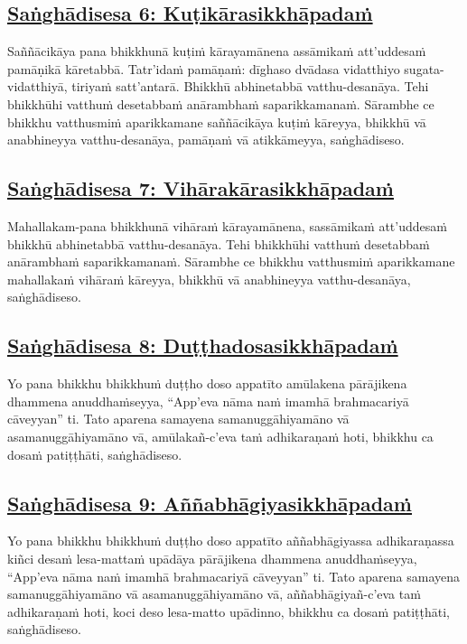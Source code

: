 \subsection*{\hyperref[comm6]{Saṅghādisesa 6: Kuṭikārasikkhāpadaṁ}}
\label{sd6}
Saññācikāya pana bhikkhunā kuṭiṁ kārayamānena assāmikaṁ att'uddesaṁ pamāṇikā kāretabbā. Tatr'idaṁ pamāṇaṁ: dīghaso dvādasa vidatthiyo sugata-vidatthiyā, tiriyaṁ satt'antarā. Bhikkhū abhinetabbā vatthu-desanāya. Tehi bhikkhūhi vatthuṁ desetabbaṁ anārambhaṁ saparikkamanaṁ. Sārambhe ce bhikkhu vatthusmiṁ aparikkamane saññācikāya kuṭiṁ kāreyya, bhikkhū vā anabhineyya vatthu-desanāya, pamāṇaṁ vā atikkāmeyya, saṅghādiseso.

\subsection*{\hyperref[comm7]{Saṅghādisesa 7: Vihārakārasikkhāpadaṁ}}
\label{sd7}
Mahallakam-pana bhikkhunā vihāraṁ kārayamānena, sassāmikaṁ att'uddesaṁ bhikkhū abhinetabbā vatthu-desanāya. Tehi bhikkhūhi vatthuṁ desetabbaṁ anārambhaṁ saparikkamanaṁ. Sārambhe ce bhikkhu vatthusmiṁ aparikkamane mahallakaṁ vihāraṁ kāreyya, bhikkhū vā anabhineyya vatthu-desanāya, saṅghādiseso.

\subsection*{\hyperref[comm8]{Saṅghādisesa 8: Duṭṭhadosasikkhāpadaṁ}}
\label{sd8}
Yo pana bhikkhu bhikkhuṁ duṭṭho doso appatīto amūlakena pārājikena dhammena anuddhaṁseyya, “App'eva nāma naṁ imamhā brahmacariyā cāveyyan” ti. Tato aparena samayena samanuggāhiyamāno vā asamanuggāhiyamāno vā, amūlakañ-c'eva taṁ adhikaraṇaṁ hoti, bhikkhu ca dosaṁ patiṭṭhāti, saṅghādiseso.

\subsection*{\hyperref[comm9]{Saṅghādisesa 9: Aññabhāgiyasikkhāpadaṁ}}
\label{sd9}
Yo pana bhikkhu bhikkhuṁ duṭṭho doso appatīto aññabhāgiyassa adhikaraṇassa kiñci desaṁ lesa-mattaṁ upādāya pārājikena dhammena anuddhaṁseyya, “App'eva nāma naṁ imamhā brahmacariyā cāveyyan” ti. Tato aparena samayena samanuggāhiyamāno vā asamanuggāhiyamāno vā, aññabhāgiyañ-c'eva taṁ adhikaraṇaṁ hoti, koci deso lesa-matto upādinno, bhikkhu ca dosaṁ patiṭṭhāti, saṅghādiseso.

